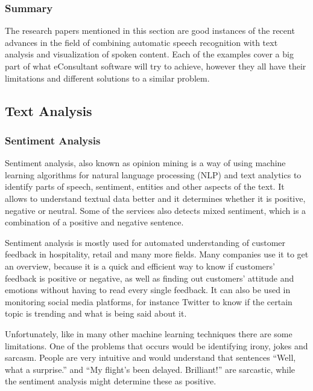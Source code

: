 \documentclass{article}
\begin{document}
\subsubsection{Summary}
{\large
The research papers mentioned in this section are good instances of the recent advances in the field of combining automatic speech recognition with text analysis and visualization of spoken content. Each of the examples cover a big part of what eConsultant software will try to achieve, however they all have their limitations and different solutions to a similar problem.\par
}

\subsection{Text Analysis}
\subsubsection{Sentiment Analysis}
{\large
Sentiment analysis, also known as opinion mining is a way of using machine learning algorithms for natural language processing (NLP) and text analytics to identify parts of speech, sentiment, entities and other aspects of the text. It allows to understand textual data better and it determines whether it is positive, negative or neutral. Some of the services also detects mixed sentiment, which is a combination of a positive and negative sentence.\par

Sentiment analysis is mostly used for automated understanding of customer feedback in hospitality, retail and many more fields. Many companies use it to get an overview, because it is a quick and efficient way to know if customers' feedback is positive or negative, as well as finding out customers' attitude and emotions without having to read every single feedback. It can also be used in monitoring social media platforms, for instance Twitter to know if the certain topic is trending and what is being said about it.\par

Unfortunately, like in many other machine learning techniques there are some limitations. One of the problems that occurs would be identifying irony, jokes and sarcasm. People are very intuitive and would understand that sentences ``Well, what a surprise.'' and ``My flight’s been delayed. Brilliant!'' are sarcastic, while the sentiment analysis might determine these as positive.\par
}
\newpage
\end{document}
